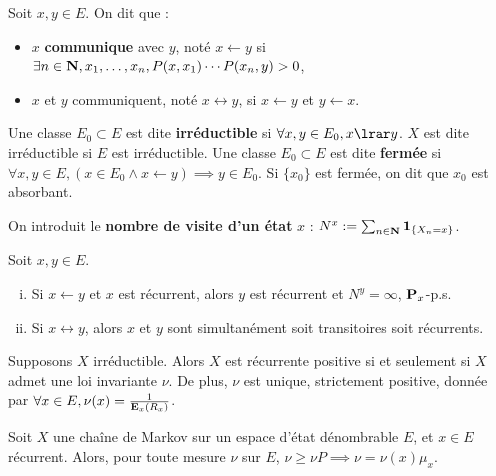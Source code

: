 \begin{defn}
	Soit $x, y \in E$.
	On dit que :
	\begin{itemize}
		\item[\textbullet] $x$ \textbf{communique} avec $y$, noté $x \leftarrow y$ si $\exists n \in \mathbf{N}, x_1,\ldots,x_n, P(x,x_1) \cdots P(x_n,y) > 0$,
		\item[\textbullet] $x$ et $y$ communiquent, noté $x \leftrightarrow y$, si $x \leftarrow y$ et $y \leftarrow x$.
	\end{itemize}
\end{defn}

\begin{defn}
	Une classe $E_0 \subset E$ est dite \textbf{irréductible} si $\forall x,y \in E_0, x \lrar y$.
	$X$ est dite irréductible si $E$ est irréductible.
	Une classe $E_0 \subset E$ est dite \textbf{fermée} si $\forall x,y \in E, (x \in E_0 \wedge x \leftarrow y) \implies y \in E_0$.
	Si $\{ x_0 \}$ est fermée, on dit que $x_0$ est absorbant.
\end{defn}

On introduit le \textbf{nombre de visite d'un état} $x$ : $N^x := \sum_{n \in \mathbf{N}} \operatorname{\mathbf{1}}_{\{ X_n = x \} }$.

\begin{pop}
	Soit $x,y \in E$.
	\begin{enumerate}[(i)]
		\item Si $x \leftarrow y$ et $x$ est récurrent, alors $y$ est récurrent et $N^y = \infty$, $\mathbf{P}_x$-p.s.
		\item Si $x \leftrightarrow y$, alors $x$ et $y$ sont simultanément soit transitoires soit récurrents.
	\end{enumerate}
\end{pop}

\begin{thm}
	Supposons $X$ irréductible.
	Alors $X$ est récurrente positive si et seulement si $X$ admet une loi invariante $\nu$.
	De plus, $\nu$ est unique, strictement positive, donnée par $\forall x \in E, \nu(x) = \frac{1}{\mathbf{E}_x(R_x)}$.
\end{thm}

\begin{pop}
	Soit $X$ une chaîne de Markov sur un espace d'état dénombrable $E$, et $x \in E$ récurrent.
	Alors, pour toute mesure $\nu$ sur $E$, $\nu \geq \nu P \implies \nu = \nu(x) \mu_x$.
\end{pop}
